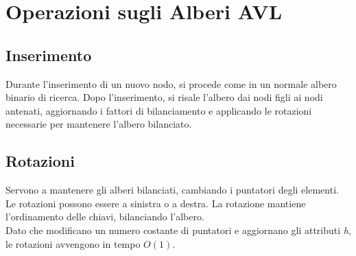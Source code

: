 \documentclass[a4paper,12pt]{article}
\begin{document}
\newpage
\section{Operazioni sugli Alberi AVL}
\subsection{Inserimento}
Durante l'inserimento di un nuovo nodo, si procede come in un normale albero binario di ricerca. Dopo l'inserimento, si risale l'albero dai nodi figli ai nodi antenati, aggiornando i fattori di bilanciamento e applicando le rotazioni necessarie per mantenere l'albero bilanciato.

\subsection{Rotazioni}
Servono a mantenere gli alberi bilanciati, cambiando i puntatori degli elementi. Le rotazioni possono essere a sinistra o a destra. La rotazione mantiene l'ordinamento delle chiavi, bilanciando l'albero.\\
Dato che modificano un numero costante di puntatori e aggiornano gli attributi \textit{h}, le rotazioni avvengono in tempo $O(1)$.\\
\end{document}
